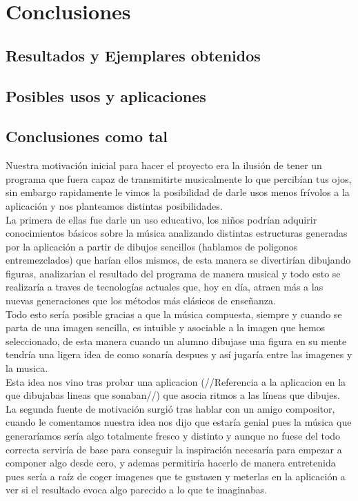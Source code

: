 \chapter{Conclusiones}

\section{Resultados y Ejemplares obtenidos}


\section{Posibles usos y aplicaciones}


\section{Conclusiones como tal}


Nuestra motivación inicial para hacer el proyecto era la ilusión de tener un programa que fuera capaz de transmitirte musicalmente lo que percibían tus ojos, sin embargo rapidamente le vimos la posibilidad de darle usos menos frívolos a la aplicación y nos planteamos distintas posibilidades.
\newline
\\La primera de ellas fue darle un uso educativo, los niños podrían adquirir conocimientos básicos sobre la música analizando distintas estructuras generadas por la aplicación a partir de dibujos sencillos (hablamos de poligonos entremezclados) que harían ellos mismos, de esta manera se divertirían dibujando figuras, analizarían el resultado del programa de manera musical y todo esto se realizaría a traves de tecnologías actuales que,  hoy en día, atraen más a las nuevas generaciones que los métodos más clásicos de enseñanza.
\newline
\\Todo esto sería posible gracias a que la música compuesta, siempre y cuando se parta de una imagen sencilla, es intuible y asociable a la imagen que hemos seleccionado, de esta manera cuando un alumno dibujase una figura en su mente tendría una ligera idea de como sonaría despues y así jugaría entre las imagenes y la musica.
\\Esta idea nos vino tras probar una aplicacion (//Referencia a la aplicacion en la que dibujabas lineas que sonaban//) que asocia ritmos a las líneas que dibujes.
\newline
\\La segunda fuente de motivación surgió tras hablar con un amigo compositor, cuando le comentamos nuestra idea nos dijo que estaría genial pues la música que generaríamos sería algo totalmente fresco y distinto y aunque no fuese del todo correcta serviría de base para conseguir la inspiración necesaría para empezar a componer algo desde cero, y ademas permitiría hacerlo de manera entretenida pues sería  a raíz de coger imagenes que te gustasen y meterlas en la aplicación a ver si el resultado evoca algo parecido a lo que te imaginabas.

